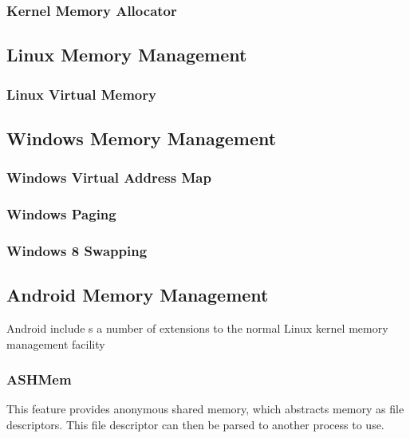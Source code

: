 \documentclass[11pt]{article}
\begin{document}
\subsubsection{Kernel Memory Allocator}
\label{sec:orgheadline73}

\subsection{Linux Memory Management}
\label{sec:orgheadline76}

\subsubsection{Linux Virtual Memory}
\label{sec:orgheadline75}

\subsection{Windows Memory Management}
\label{sec:orgheadline80}

\subsubsection{Windows Virtual Address Map}
\label{sec:orgheadline77}

\subsubsection{Windows Paging}
\label{sec:orgheadline78}

\subsubsection{Windows 8 Swapping}
\label{sec:orgheadline79}

\subsection{Android Memory Management}
\label{sec:orgheadline84}

Android include s a number of extensions to the normal Linux kernel memory management facility

\subsubsection{ASHMem}
\label{sec:orgheadline81}

This feature provides anonymous shared memory, which abstracts memory
as file descriptors. This file descriptor can then be parsed to another
process to use.
\end{document}
